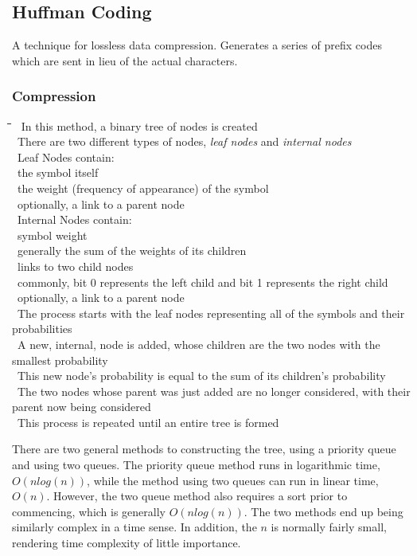 \documentclass[10pt,letterpaper]{scrartcl}
\newcommand{\tbul}{\textbullet}
\newcommand{\tend}{\>\textendash}
\newcommand{\tasc}{\>\>\textasteriskcentered}
\newcommand{\tabDef}{\hspace{2em}\=\hspace{2em}\=\hspace{2em}\=\hspace{2em}\=\kill}
\begin{document}
\subsection{Huffman Coding}
A technique for lossless data compression. Generates a series of prefix codes which are sent in lieu of the actual characters. 
\subsubsection{Compression}
\begin{tabbing}\tabDef 
	\tbul\ In this method, a binary tree of nodes is created \\
	\tbul\ There are two different types of nodes, \textit{leaf nodes} and \textit{internal nodes} \\
	\tbul\ Leaf Nodes contain: \\
	\tend\ the symbol itself \\
	\tend\ the weight (frequency of appearance) of the symbol \\
	\tend\ optionally, a link to a parent node \\
	\tbul\ Internal Nodes contain: \\
	\tend\ symbol weight \\
	\tasc\ generally the sum of the weights of its children \\
	\tend\ links to two child nodes \\
	\tasc\ commonly, bit 0 represents the left child and bit 1 represents the right child \\
	\tend\ optionally, a link to a parent node \\
	\tbul\ The process starts with the leaf nodes representing all of the symbols and their probabilities \\
	\tbul\ A new, internal, node is added, whose children are the two nodes with the smallest probability \\
	\tbul\ This new node's probability is equal to the sum of its children's probability \\ 
	\tbul\ The two nodes whose parent was just added are no longer considered, with their parent now being considered \\
	\tbul\ This process is repeated until an entire tree is formed
\end{tabbing}
There are two general methods to constructing the tree, using a priority queue and using two queues. The priority queue method runs in logarithmic time, $O(nlog(n))$, while the method using two queues can run in linear time, $O(n)$. However, the two queue method also requires a sort prior to commencing, which is generally $O(nlog(n))$. The two methods end up being similarly complex in a time sense. In addition, the $n$ is normally fairly small, rendering time complexity of little importance. 
\end{document}
